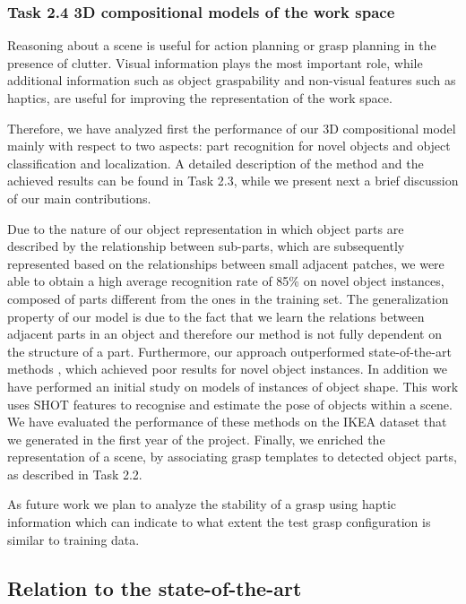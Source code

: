 \documentclass[a4paper,11pt,pdf]{pacmanreport}
\begin{document}
\subsubsection{Task 2.4 3D compositional models of the work space}

Reasoning about a scene is useful for action planning or grasp planning in the presence of clutter. Visual information plays the most important role, while additional information such as object graspability and non-visual features such as haptics, are useful for improving the representation of the work space.

Therefore, we have analyzed first the performance of our 3D compositional model mainly with respect to two aspects: part recognition for novel objects and object classification and localization. A detailed description of the method and the achieved results can be found in Task 2.3, while we present next a brief discussion of our main contributions.

Due to the nature of our object representation in which object parts are described by the relationship between sub-parts, which are subsequently represented based on the relationships between small adjacent patches, we were able to obtain a high average recognition rate of 85\% on novel object instances, composed of parts different from the ones in the training set. The generalization property of our model is due to the fact that we learn the relations between adjacent parts in an object and therefore our method is not fully dependent on the structure of a part. Furthermore, our approach outperformed state-of-the-art methods \cite{vfh}, which achieved poor results  for novel object instances. In addition we have performed an initial study on models of instances of object shape. This work uses SHOT features to recognise and estimate the pose of objects within a scene. We have evaluated the performance of these methods on the IKEA dataset that we generated in the first year of the project. Finally, we enriched the representation of a scene, by associating grasp templates to detected object parts, as described in Task 2.2.

As future work we plan to analyze the stability of a grasp using haptic information which can indicate to what extent the test grasp configuration is similar to training data.

\subsection{Relation to the state-of-the-art}
\end{document}
